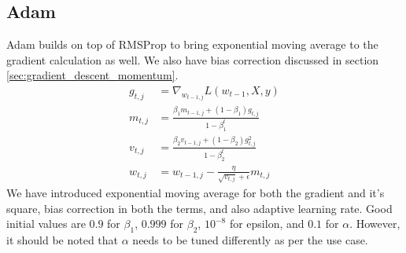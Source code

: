 \documentclass[../../deep_learning_notes.tex]{subfiles}
\begin{document}
\subsection{Adam}
Adam builds on top of RMSProp to bring exponential moving average to the gradient calculation as well. We also have bias correction discussed in section \ref{sec:gradient_descent_momentum}.
\begin{align*}
    g_{t,j} &= \nabla_{w_{t-1, j}}L(w_{t-1}, X, y)\\
    m_{t,j} &= \frac{\beta_{1} m_{t-1,j} + (1-\beta_{1}) g_{t,j}}{1 - \beta_{1}^{t}}\\
    v_{t,j} &= \frac{\beta_{2} v_{t-1,j} + (1-\beta_{2})g_{t,j}^{2}}{1 - \beta_{2}^{t}}\\
    w_{t,j} &= w_{t-1,j} - \frac{\eta}{\sqrt{v_{t,j}} + \epsilon} m_{t,j} 
\end{align*}
We have introduced exponential moving average for both the gradient and it's square, bias correction in both the terms, and also adaptive learning rate. Good initial values are $0.9$ for $\beta_{1}$, $0.999$ for $\beta_{2}$, $10^{-8}$ for epsilon, and $0.1$ for $\alpha$. However, it should be noted that $\alpha$ needs to be tuned differently as per the use case.
\end{document}
